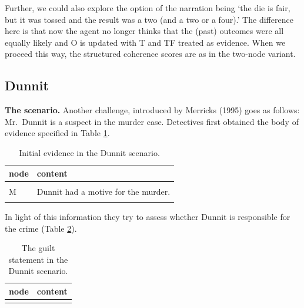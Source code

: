 \documentclass[
  10pt,
]{scrartcl}
\newcommand{\s}[1]{\textsf{#1}}
\begin{document}
Further, we could also explore the option of the narration being `the die is fair, but it was tossed and the result was a two (and a two or a four).' The difference here is that now the agent no longer thinks that the (past) outcomes were all equally likely and \s{O} is updated with \s{T} and \s{TF} treated as evidence. When we proceed this way, the structured coherence scores are as in the two-node variant.

\hypertarget{dunnit}{%
\subsection{Dunnit}\label{dunnit}}

\textbf{The scenario.} Another challenge, introduced by Merricks (1995) goes as follows: Mr.~Dunnit is a suspect in the murder case. Detectives first obtained the body of evidence specified in Table \ref{tab:dunnitPropositions1}.

\begin{table}[H]

\caption{\label{tab:dunnitPropositions1}Initial evidence in the Dunnit scenario.}
\centering
\begin{tabular}[t]{l>{\raggedright\arraybackslash}p{25em}}
\toprule
node & content\\
\midrule
\cellcolor{gray!6}{I} & \cellcolor{gray!6}{Witnesses claim to have seen Dunnit do it (incriminating testimony).}\\
M & Dunnit had a motive for the murder.\\
\cellcolor{gray!6}{W} & \cellcolor{gray!6}{A credible witness claims to have seen Dunnit two hundred miles from the scene of the crime at the time of the murder.}\\
\bottomrule
\end{tabular}
\end{table}

\noindent In light of this information they try to assess whether Dunnit is responsible for the crime (Table \ref{tab:dunnitPropositions2}).

\begin{table}[H]

\caption{\label{tab:dunnitPropositions2}The guilt statement in the Dunnit scenario.}
\centering
\begin{tabular}[t]{l>{\raggedright\arraybackslash}p{25em}}
\toprule
node & content\\
\midrule
\cellcolor{gray!6}{G} & \cellcolor{gray!6}{Dunnit is guilty.}\\
\bottomrule
\end{tabular}
\end{table}
\end{document}
